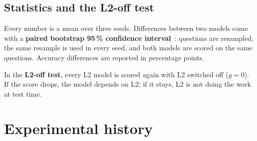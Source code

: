 \documentclass[a4paper,11pt,parskip=half]{scrartcl}
\begin{document}
\subsection{Statistics and the L2-off test}

Every number is a mean over three seeds. Differences between two models come with a \textbf{paired bootstrap 95\,\% confidence interval}~\cite{bootstrap}: questions are resampled, the same resample is used in every seed, and both models are scored on the same questions. Accuracy differences are reported in percentage points.

In the \textbf{L2-off test}, every L2 model is scored again with L2 switched off ($g=0$). If the score drops, the model depends on L2; if it stays, L2 is not doing the work at test time.

\section{Experimental history}
\label{sec:history}
\end{document}
